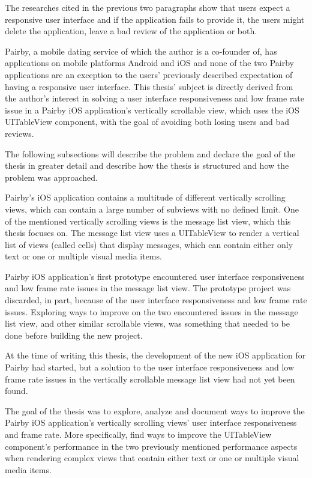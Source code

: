 \documentclass[a4paper,12pt]{article}
\begin{document}
The researches cited in the previous two paragraphs show that users expect a responsive user interface and if the application fails to provide it, the users might delete the application, leave a bad review of the application or both.

Pairby, a mobile dating service of which the author is a co-founder of, has applications on mobile platforms Android and iOS and none of the two Pairby applications are an exception to the users' previously described expectation of having a responsive user interface. This thesis' subject is directly derived from the author's interest in solving a user interface responsiveness and low frame rate issue in a Pairby iOS application's vertically scrollable view, which uses the iOS UITableView component, with the goal of avoiding both losing users and bad reviews.

The following subsections will describe the problem and declare the goal of the thesis in greater detail and describe how the thesis is structured and how the problem was approached.

Pairby's iOS application contains a multitude of different vertically scrolling views, which can contain a large number of subviews with no defined limit. One of the mentioned vertically scrolling views is the message list view, which this thesis focuses on. The message list view uses a UITableView to render a vertical list of views (called cells) that display messages, which can contain either only text or one or multiple visual media items.

Pairby iOS application's first prototype encountered user interface responsiveness and low frame rate issues in the message list view. The prototype project was discarded, in part, because of the user interface responsiveness and low frame rate issues. Exploring ways to improve on the two encountered issues in the message list view, and other similar scrollable views, was something that needed to be done before building the new project.

At the time of writing this thesis, the development of the new iOS application for Pairby had started, but a solution to the user interface responsiveness and low frame rate issues in the vertically scrollable message list view had not yet been found.

The goal of the thesis was to explore, analyze and document ways to improve the Pairby iOS application's vertically scrolling views' user interface responsiveness and frame rate. More specifically, find ways to improve the UITableView component's performance in the two previously mentioned performance aspects when rendering complex views that contain either text or one or multiple visual media items.
\end{document}
